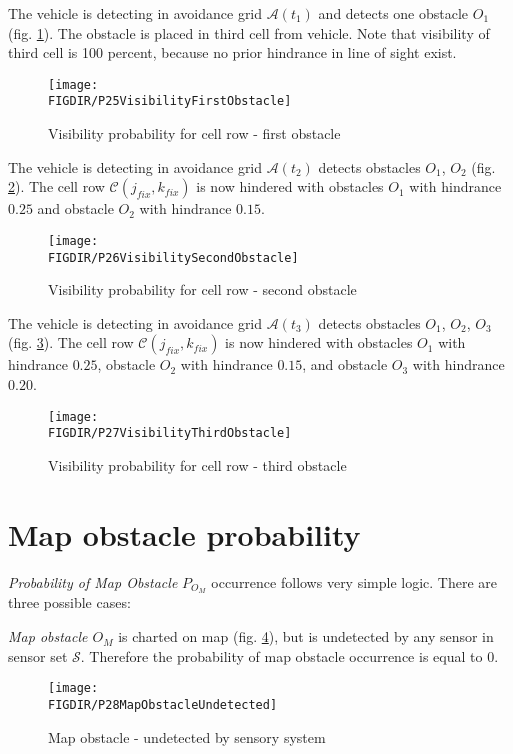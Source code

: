 \noindent The vehicle is detecting in avoidance grid $\mathscr{A}(t_1)$ and detects one obstacle $O_1$ (fig. \ref{fig:P25VisibilityFirstObstacle}). The obstacle is placed in third cell from vehicle. Note that visibility of third cell is 100 percent, because no prior hindrance in line of sight exist. 
\begin{figure}[H]
    \centering
    \texttt{[image: \\FIGDIR/P25VisibilityFirstObstacle]}
    \caption{Visibility probability for cell row - first obstacle}
    \label{fig:P25VisibilityFirstObstacle}
\end{figure}

\noindent The vehicle is detecting in avoidance grid $\mathscr{A}(t_2)$ detects obstacles $O_1$, $O_2$ (fig. \ref{fig:P26VisibilitySecondObstacle}). The cell row $\mathscr{C}(j_{fix},k_{fix})$ is now  hindered with obstacles $O_1$ with hindrance $0.25$ and obstacle $O_2$ with hindrance $0.15$.
\begin{figure}[H]
    \centering
    \texttt{[image: \\FIGDIR/P26VisibilitySecondObstacle]}
    \caption{Visibility probability for cell row - second obstacle}
    \label{fig:P26VisibilitySecondObstacle}
\end{figure}

\noindent The vehicle is detecting in avoidance grid $\mathscr{A}(t_3)$ detects obstacles $O_1$, $O_2$, $O_3$ (fig. \ref{fig:P27VisibilityThirdObstacle}). The cell row $\mathscr{C}(j_{fix},k_{fix})$ is now  hindered with obstacles $O_1$ with hindrance $0.25$, obstacle $O_2$ with hindrance $0.15$, and obstacle $O_3$ with hindrance $0.20$.
\begin{figure}[H]
    \centering
    \texttt{[image: \\FIGDIR/P27VisibilityThirdObstacle]}
    \caption{Visibility probability for cell row - third obstacle}
    \label{fig:P27VisibilityThirdObstacle}
\end{figure}

\section{Map obstacle probability}\label{sec:mapObstacleProbability}
\noindent\emph{Probability of Map Obstacle} $P_{O_M}$ occurrence follows very simple logic. There are three possible cases:

\noindent\emph{Map obstacle $O_M$} is charted on map (fig. \ref{fig:P28MapObstacleUndetected}), but is undetected by any sensor in sensor set $\mathscr{S}$. Therefore the probability of map obstacle occurrence is equal to $0$.
\begin{figure}[H]
    \centering
    \texttt{[image: \\FIGDIR/P28MapObstacleUndetected]}
    \caption{Map obstacle - undetected by sensory system}
    \label{fig:P28MapObstacleUndetected}
\end{figure}

